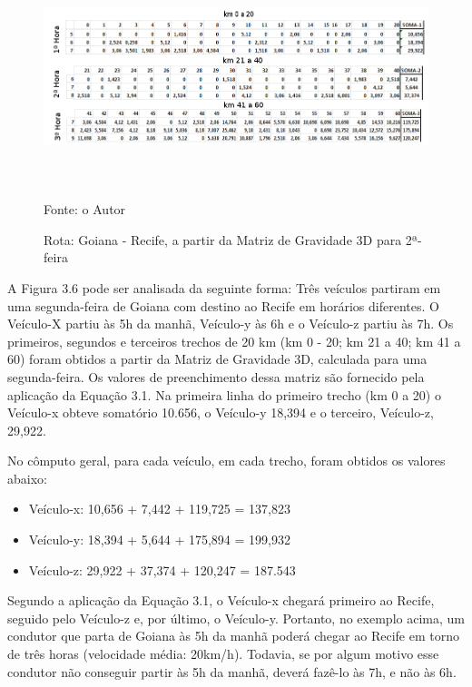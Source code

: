\begin{figure}[ht]
	\centering
	\caption{Rota: Goiana - Recife, a partir da Matriz de Gravidade 3D para 2ª-feira}
	\includegraphics[width=160mm, height=70mm]{Figuras/Metodologia/RotaExemplo.png}\\
	\tiny Fonte: o Autor
\end{figure}

A Figura 3.6 pode ser analisada da seguinte forma:
 Três veículos partiram em uma segunda-feira de Goiana com destino ao Recife em horários diferentes. O Veículo-X partiu às 5h da manhã, Veículo-y às 6h e o Veículo-z partiu às 7h. 
 Os primeiros, segundos e terceiros trechos de 20 km (km 0 - 20; km 21 a 40; km 41 a 60) foram obtidos a partir da Matriz de Gravidade 3D, calculada para uma segunda-feira. Os valores de preenchimento dessa matriz são fornecido pela aplicação da Equação 3.1. Na primeira linha do primeiro trecho (km 0 a 20) o Veículo-x obteve somatório 10.656, o Veículo-y 18,394 e o terceiro, Veículo-z, 29,922.
 
 No cômputo geral, para cada veículo, em cada trecho, foram obtidos os valores abaixo:
 
 \begin{itemize}
 	\item Veículo-x: 10,656 +  7,442 + 119,725 = 137,823
 	\item Veículo-y: 18,394 +  5,644 + 175,894 = 199,932
 	\item Veículo-z: 29,922 + 37,374 + 120,247 = 187.543
 \end{itemize} 
 
 Segundo a aplicação da Equação 3.1, o Veículo-x chegará primeiro ao Recife, seguido pelo Veículo-z e, por último, o Veículo-y. Portanto, no exemplo acima, um condutor que parta de Goiana às 5h da manhã poderá chegar ao Recife em torno de três horas (velocidade média: 20km/h). Todavia, se por algum motivo esse condutor não conseguir partir às 5h da manhã, deverá fazê-lo às 7h, e não às 6h. 
 
 
